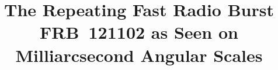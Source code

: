 \documentclass[twocolumn]{aastex61}
\begin{document}
\title{The Repeating Fast Radio Burst FRB~121102 as Seen on Milliarcsecond Angular Scales}


\end{document}
